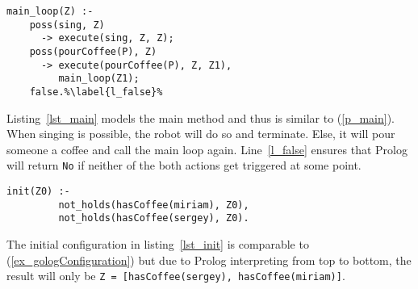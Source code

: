 \begin{lstlisting}[firstnumber=10, caption={Main method which either tells the robot to sing or to pour coffee.}, label=lst_main]
  main_loop(Z) :-
    poss(sing, Z)
      -> execute(sing, Z, Z);
    poss(pourCoffee(P), Z)
      -> execute(pourCoffee(P), Z, Z1),
         main_loop(Z1);
    false.%\label{l_false}%
\end{lstlisting}
Listing~\ref{lst_main} models the main method and thus is similar to (\ref{p_main}). When singing is possible, the robot will do so and terminate. Else, it will pour someone a coffee and call the main loop again. Line~\ref{l_false} ensures that Prolog will return \texttt{No} if neither of the both actions get triggered at some point.
\begin{lstlisting}[firstnumber=17, caption={Initial configuration.}, label=lst_init]
  init(Z0) :-
         not_holds(hasCoffee(miriam), Z0),
         not_holds(hasCoffee(sergey), Z0).
\end{lstlisting}
The initial configuration in listing~\ref{lst_init} is comparable to (\ref{ex_gologConfiguration}) but due to Prolog interpreting from top to bottom, the result will only be \texttt{Z = [hasCoffee(sergey), hasCoffee(miriam)]}.
